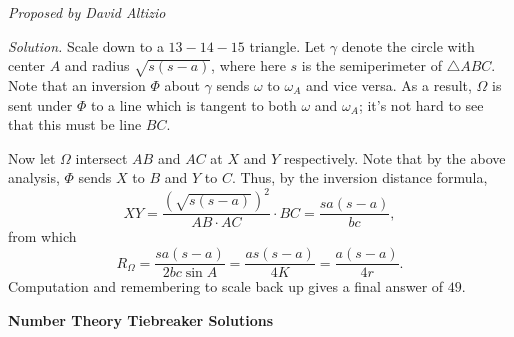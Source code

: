 \documentclass[10pt]{article}
\newcounter{enum}
\newcommand{\proposed}[1]
{
\vspace{5pt}
\noindent\textit{Proposed by #1}
}
\newcommand{\solution}
{
\vspace{5pt}
\noindent\textit{Solution.}\qquad
}
\begin{document}
\begin{enumerate}
\proposed{David Altizio}

\solution Scale down to a $13-14-15$ triangle.  Let $\gamma$ denote the circle with center $A$ and radius $\sqrt{s(s-a)}$, where here $s$ is the semiperimeter of $\triangle ABC$.  Note that an inversion $\Phi$ about $\gamma$ sends $\omega$ to $\omega_A$ and vice versa.  As a result, $\Omega$ is sent under $\Phi$ to a line which is tangent to both $\omega$ and $\omega_A$; it's not hard to see that this must be line $BC$.

\par Now let $\Omega$ intersect $AB$ and $AC$ at $X$ and $Y$ respectively.  Note that by the above analysis, $\Phi$ sends $X$ to $B$ and $Y$ to $C$.  Thus, by the inversion distance formula, \[XY = \dfrac{\left(\sqrt{s(s-a)}\right)^2}{AB\cdot AC}\cdot BC =\dfrac{sa(s-a)}{bc},\] from which \[R_{\Omega} = \dfrac{sa(s-a)}{2bc\sin A} = \dfrac{as(s-a)}{4K} = \dfrac{a(s-a)}{4r}.\]  Computation and remembering to scale back up gives a final answer of $\boxed{49}$.

\end{enumerate}


\newpage

\begin{center}
\huge\textbf{Number Theory Tiebreaker Solutions}
\end{center}

\newpage
\end{document}
